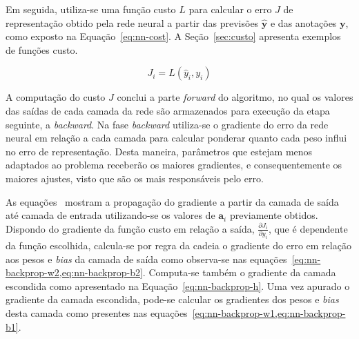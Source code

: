 Em seguida, utiliza-se uma função custo $L$ para calcular o erro $J$ de representação obtido pela rede neural a partir
das previsões $\mathbf{\hat{y}}$ e das anotações $\mathbf{y}$, como exposto na Equação~\ref{eq:nn-cost}.
A Seção~\ref{sec:custo} apresenta exemplos de funções custo.

\begin{equation} \label{eq:nn-cost}
    J_i = L(\hat{y}_i, y_i)
\end{equation}

A computação do custo $J$ conclui a parte \textit{forward} do algoritmo, no qual os valores das saídas de cada camada da
rede são armazenados para execução da etapa seguinte, a \textit{backward}.
Na fase \textit{backward} utiliza-se o gradiente do erro da rede neural em relação a cada camada para calcular ponderar
quanto cada peso influi no erro de representação.
Desta maneira, parâmetros que estejam menos adaptados ao problema receberão os maiores gradientes, e consequentemente os
maiores ajustes, visto que são os mais responsáveis pelo erro.

As equações~ mostram a propagação do gradiente a partir da camada de
saída até camada de entrada utilizando-se os valores de $\mathbf{a}_i$ previamente obtidos.
Dispondo do gradiente da função custo em relação a saída, $\frac{\partial{J_i}}{\partial{y_i}}$, que é dependente da
função escolhida, calcula-se por regra da cadeia o gradiente do erro em relação aos pesos e \textit{bias} da camada de
saída como observa-se nas equações~\cref{eq:nn-backprop-w2,eq:nn-backprop-b2}.
Computa-se também o gradiente da camada escondida como apresentado na Equação~\ref{eq:nn-backprop-h}.
Uma vez apurado o gradiente da camada escondida, pode-se calcular os gradientes dos pesos e \textit{bias} desta camada
como presentes nas equações~\cref{eq:nn-backprop-w1,eq:nn-backprop-b1}.

